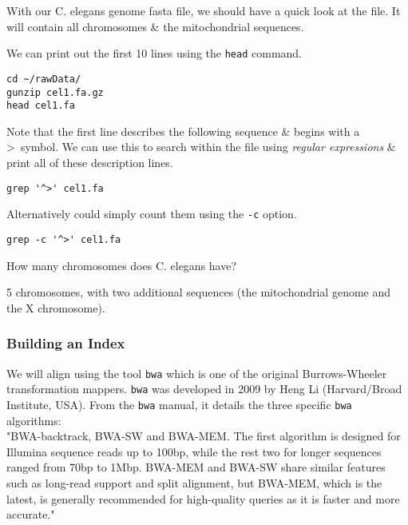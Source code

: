 \begin{information}
With our C. elegans genome fasta file, we should have a quick look at the file.
It will contain all chromosomes \& the mitochondrial sequences.
\end{information}

\begin{steps}
We can print out the first 10 lines using the \texttt{head} command.
\begin{lstlisting}
cd ~/rawData/
gunzip cel1.fa.gz
head cel1.fa
\end{lstlisting}
Note that the first line describes the following sequence \& begins with a \textgreater ~symbol.
We can use this to search within the file using \textit{regular expressions} \& print all of these description lines.
\begin{lstlisting}
grep '^>' cel1.fa
\end{lstlisting}
Alternatively could simply count them using the \texttt{-c} option.
\begin{lstlisting}
grep -c '^>' cel1.fa
\end{lstlisting}
\end{steps}

\begin{questions}
How many chromosomes does C. elegans have?\\
\begin{answer}
5 chromosomes, with two additional sequences (the mitochondrial genome and the X chromosome).
\end{answer}
\end{questions}

\subsubsection{Building an Index}
We will align using the tool \texttt{bwa} which is one of the original Burrows-Wheeler transformation mappers.
\texttt{bwa} was developed in 2009 by Heng Li (Harvard/Broad Institute, USA).
From the \texttt{bwa} manual, it details the three specific \texttt{bwa} algorithms: \\
"BWA-backtrack, BWA-SW and BWA-MEM. The first algorithm is designed for Illumina  sequence  reads up to 100bp, while the rest two for longer sequences ranged from 70bp to 1Mbp. BWA-MEM and BWA-SW share similar features such as long-read support and split alignment, but BWA-MEM, which is the latest, is generally recommended for high-quality queries as it  is  faster  and  more accurate."  \\


